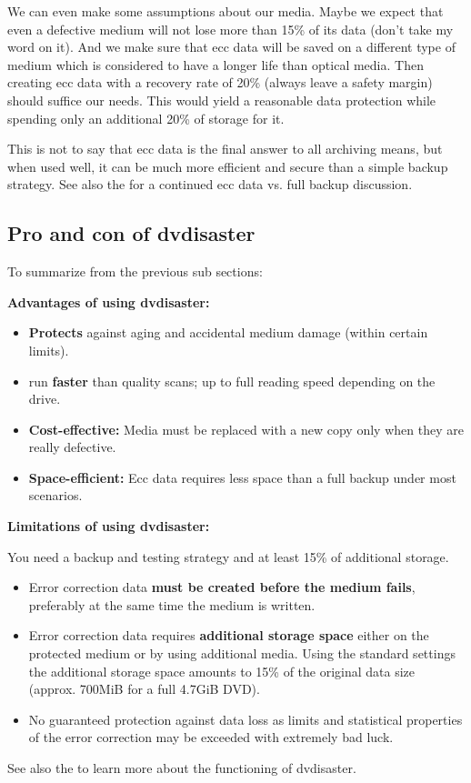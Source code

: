 \smallskip

We can even make some assumptions about our media. Maybe we expect
that even a defective medium will not lose more than 15\% of its data 
(don't take my word on it). And we make sure that ecc data will be saved
on a different type of medium which is considered to have a longer life than optical
media. Then creating ecc data with a recovery rate of 20\% (always
leave a safety margin) should suffice our needs. 
This would yield a reasonable data protection
while spending only an additional 20\% of storage for it. 

\smallskip

This is not to say that ecc data is the final answer to all
archiving means, but when used well, it can be much more
efficient and secure than a simple backup strategy. See also the
 for a continued
ecc data vs. full backup discussion.

\subsection{Pro and con of dvdisaster}

To summarize from the previous sub sections:

\bigskip
{\bf Advantages of using dvdisaster:}

\begin{itemize}
\item {\bf Protects} against aging and accidental medium damage (within certain limits).
\item {} run {\bf faster} than quality scans; up to full reading speed depending on the drive.
\item {\bf Cost-effective:} Media must be replaced with a new copy only when they are really defective.
\item {\bf Space-efficient:} Ecc data requires less space than a full backup under most scenarios.
\end{itemize}

\bigskip
{\bf Limitations of using dvdisaster:}

\medskip

You need a backup and testing strategy and at least 15\% of additional storage.

\begin{itemize}
\item Error correction data {\bf must be created before the medium fails}, preferably at the same time the medium is written.
\item Error correction data requires {\bf additional storage space} either on the protected medium or by using additional media. Using the standard settings the additional storage space amounts to 15\% of the original data size (approx. 700MiB for a full 4.7GiB DVD).
\item No guaranteed protection against data loss as limits and statistical properties of the
  error correction may be exceeded with extremely bad luck.
\end{itemize}

\bigskip

See also the  to learn
more about the functioning of dvdisaster.
